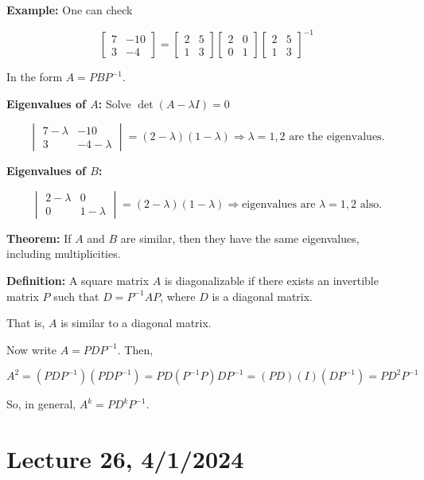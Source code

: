 \documentclass{article}
\begin{document}
\textbf{Example:} One can check

\[
\begin{bmatrix} 7 & -10 \\ 3 & -4 \end{bmatrix} = \begin{bmatrix} 2 & 5 \\ 1 & 3 \end{bmatrix} \begin{bmatrix} 2 & 0 \\ 0 & 1 \end{bmatrix} \begin{bmatrix} 2 & 5 \\ 1 & 3 \end{bmatrix}^{-1}
\]

In the form \( A = PBP^{-1} \).

\textbf{Eigenvalues of \( A \):} Solve \( \det(A-\lambda I) = 0 \) 

\[
\begin{vmatrix} 7-\lambda & -10 \\ 3 & -4-\lambda \end{vmatrix} = (2-\lambda)(1-\lambda) \Rightarrow \lambda = 1, 2 \text{ are the eigenvalues}.
\]

\textbf{Eigenvalues of \( B \):} 

\[
\begin{vmatrix} 2-\lambda & 0 \\ 0 & 1-\lambda \end{vmatrix} = (2-\lambda)(1-\lambda) \Rightarrow \text{eigenvalues are } \lambda = 1, 2 \text{ also}.
\]

\textbf{Theorem:} If \( A \) and \( B \) are similar, then they have the same eigenvalues, including multiplicities.

\textbf{Definition:} A square matrix \( A \) is diagonalizable if there exists an invertible matrix \( P \) such that \( D = P^{-1}AP \), where \( D \) is a diagonal matrix.

That is, \( A \) is similar to a diagonal matrix.

Now write \( A = PDP^{-1} \). Then,

\[
A^2 = (PDP^{-1})(PDP^{-1}) = PD(P^{-1}P)DP^{-1} = (PD)(I)(DP^{-1}) = PD^2P^{-1}
\]

So, in general, \( A^k = PD^kP^{-1} \).


\section{Lecture 26, 4/1/2024}
\end{document}
